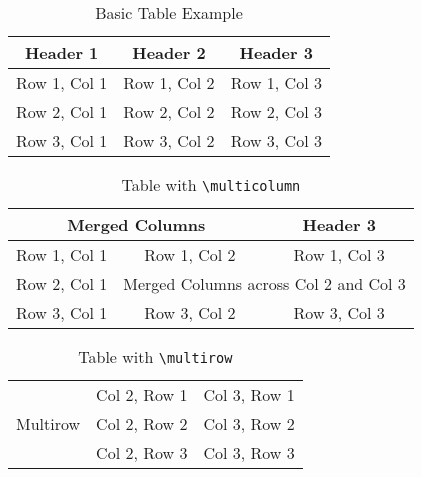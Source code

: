 \documentclass{article}
\begin{document}
\begin{table}[htbp]
    \centering
    \begin{tabular}{|c|c|c|}
        \hline
        Header 1 & Header 2 & Header 3 \\
        \hline
        Row 1, Col 1 & Row 1, Col 2 & Row 1, Col 3 \\
        \hline
        Row 2, Col 1 & Row 2, Col 2 & Row 2, Col 3 \\
        \hline
        Row 3, Col 1 & Row 3, Col 2 & Row 3, Col 3 \\
        \hline
    \end{tabular}
    \caption{Basic Table Example}
    \label{tab:basic_table}
\end{table}

\begin{table}[htbp]
    \centering
    \begin{tabular}{|c|c|c|}
        \hline
        \multicolumn{2}{|c|}{Merged Columns} & Header 3 \\
        \hline
        Row 1, Col 1 & Row 1, Col 2 & Row 1, Col 3 \\
        \hline
        Row 2, Col 1 & \multicolumn{2}{c|}{Merged Columns across Col 2 and Col 3} \\
        \hline
        Row 3, Col 1 & Row 3, Col 2 & Row 3, Col 3 \\
        \hline
    \end{tabular}
    \caption{Table with \texttt{\textbackslash multicolumn}}
    \label{tab:multicolumn_table}
\end{table}

\begin{table}[htbp]
    \centering
    \begin{tabular}{|c|c|c|}
        \hline
        \multirow{3}{*}{Multirow} & Col 2, Row 1 & Col 3, Row 1 \\
        \cline{2-3}
        & Col 2, Row 2 & Col 3, Row 2 \\
        \cline{2-3}
        & Col 2, Row 3 & Col 3, Row 3 \\
        \hline
    \end{tabular}
    \caption{Table with \texttt{\textbackslash multirow}}
    \label{tab:multirow_table}
\end{table}
\end{document}
